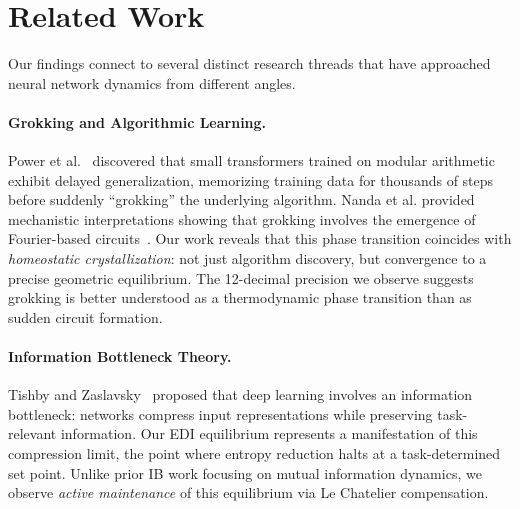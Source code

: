 \section{Related Work}\label{sec:related}

Our findings connect to several distinct research threads that have approached neural network dynamics from different angles.

\paragraph{Grokking and Algorithmic Learning.}
Power et al.~\cite{power2022grokking} discovered that small transformers trained on modular arithmetic exhibit delayed generalization, memorizing training data for thousands of steps before suddenly ``grokking'' the underlying algorithm. Nanda et al. provided mechanistic interpretations showing that grokking involves the emergence of Fourier-based circuits~\cite{elhage2021mathematical}. Our work reveals that this phase transition coincides with \textit{homeostatic crystallization}: not just algorithm discovery, but convergence to a precise geometric equilibrium. The 12-decimal precision we observe suggests grokking is better understood as a thermodynamic phase transition than as sudden circuit formation.

\paragraph{Information Bottleneck Theory.}
Tishby and Zaslavsky~\cite{tishby2015deep} proposed that deep learning involves an information bottleneck: networks compress input representations while preserving task-relevant information. Our EDI equilibrium represents a manifestation of this compression limit, the point where entropy reduction halts at a task-determined set point. Unlike prior IB work focusing on mutual information dynamics, we observe \textit{active maintenance} of this equilibrium via Le Chatelier compensation.

